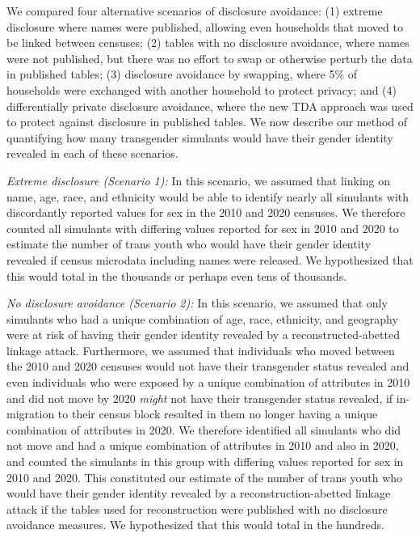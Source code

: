 \documentclass{jpc} %
\theoremstyle{plain}\newtheorem{satz}[thm]{Satz} %
\begin{document}
We compared four alternative scenarios of disclosure avoidance: (1) extreme disclosure where names were published, allowing even households that moved to be linked between censuses; (2) tables with no disclosure avoidance, where names were not published, but there was no effort to swap or otherwise perturb the data in published tables; (3) disclosure avoidance by swapping, where 5\% of households were exchanged with another household to protect privacy; and (4) differentially private disclosure avoidance, where the new TDA approach was used to protect against disclosure in published tables.  We now describe our method of quantifying how many transgender simulants would have their gender identity revealed in each of these scenarios.

\emph{Extreme disclosure (Scenario 1):} In this scenario, we assumed that linking on name, age, race, and ethnicity would be able to identify nearly all simulants with discordantly reported values for sex in the 2010 and 2020 censuses.  We therefore counted all simulants with differing values reported for sex in 2010 and 2020 to estimate the number of trans youth who would have their gender identity revealed if census microdata including names were released.  We hypothesized that this would total in the thousands or perhaps even tens of thousands.

\emph{No disclosure avoidance (Scenario 2):} In this scenario, we assumed that only simulants who had a unique combination of age, race, ethnicity, and geography were at risk of having their gender identity revealed by a reconstructed-abetted linkage attack.  Furthermore, we assumed that individuals who moved between the 2010 and 2020 censuses would not have their transgender status revealed and even individuals who were exposed by a unique combination of attributes in 2010 and did not move by 2020 \emph{might} not have their transgender status revealed, if in-migration to their census block resulted in them no longer having a unique combination of attributes in 2020.  We therefore identified all simulants who did not move and had a unique combination of attributes in 2010 and also  in 2020, and counted the simulants in this group with differing values reported for sex in 2010 and 2020.  This constituted our estimate of the number of trans youth who would have their gender identity revealed by a reconstruction-abetted linkage attack if the tables used for reconstruction were published with no disclosure avoidance measures.
We hypothesized that this would total in the hundreds.
\end{document}
